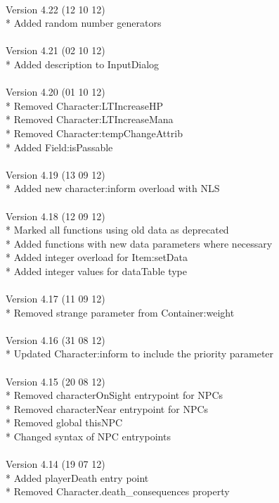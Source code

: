 \documentclass[a4paper,10pt,makeidx]{scrreprt}
\begin{document}
\\
Version 4.22 (12 10 12)\\
* Added random number generators\\
\\
Version 4.21 (02 10 12)\\
* Added description to InputDialog\\
\\
Version 4.20 (01 10 12)\\
* Removed Character:LTIncreaseHP\\
* Removed Character:LTIncreaseMana\\
* Removed Character:tempChangeAttrib\\
* Added Field:isPassable\\
\\
Version 4.19 (13 09 12)\\
* Added new character:inform overload with NLS\\
\\
Version 4.18 (12 09 12)\\
* Marked all functions using old data as deprecated\\
* Added functions with new data parameters where necessary\\
* Added integer overload for Item:setData\\
* Added integer values for dataTable type\\
\\
Version 4.17 (11 09 12)\\
* Removed strange parameter from Container:weight\\
\\
Version 4.16 (31 08 12)\\
* Updated Character:inform to include the priority parameter\\
\\
Version 4.15 (20 08 12)\\
* Removed characterOnSight entrypoint for NPCs\\
* Removed characterNear entrypoint for NPCs\\
* Removed global thisNPC\\
* Changed syntax of NPC entrypoints\\
\\
Version 4.14 (19 07 12)\\
* Added playerDeath entry point\\
* Removed Character.death\_consequences property\\ 
\\
\end{document}

